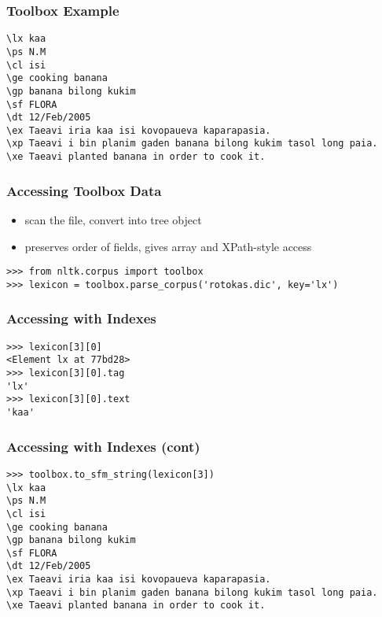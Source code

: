 \documentclass{beamer}             %
\begin{document}
\begin{frame}[fragile]
\frametitle{Toolbox Example}
\small

\begin{verbatim}
\lx kaa
\ps N.M
\cl isi
\ge cooking banana
\gp banana bilong kukim
\sf FLORA
\dt 12/Feb/2005
\ex Taeavi iria kaa isi kovopaueva kaparapasia.
\xp Taeavi i bin planim gaden banana bilong kukim tasol long paia.
\xe Taeavi planted banana in order to cook it.
\end{verbatim}
\end{frame}

\begin{frame}[fragile]
\frametitle{Accessing Toolbox Data}

\begin{itemize}
\item scan the file, convert into tree object
\item preserves order of fields, gives array and XPath-style access
\end{itemize}

\scriptsize
\begin{verbatim}
>>> from nltk.corpus import toolbox
>>> lexicon = toolbox.parse_corpus('rotokas.dic', key='lx')
\end{verbatim}
\end{frame}

\begin{frame}[fragile]
\frametitle{Accessing with Indexes}

\begin{verbatim}
>>> lexicon[3][0] 
<Element lx at 77bd28>
>>> lexicon[3][0].tag
'lx'
>>> lexicon[3][0].text
'kaa'
\end{verbatim}
\end{frame}

\begin{frame}[fragile]
\frametitle{Accessing with Indexes (cont)}

\scriptsize
\begin{verbatim}
>>> toolbox.to_sfm_string(lexicon[3])
\lx kaa
\ps N.M
\cl isi
\ge cooking banana
\gp banana bilong kukim
\sf FLORA
\dt 12/Feb/2005
\ex Taeavi iria kaa isi kovopaueva kaparapasia.
\xp Taeavi i bin planim gaden banana bilong kukim tasol long paia.
\xe Taeavi planted banana in order to cook it.
\end{verbatim}
\end{frame}
\end{document}
